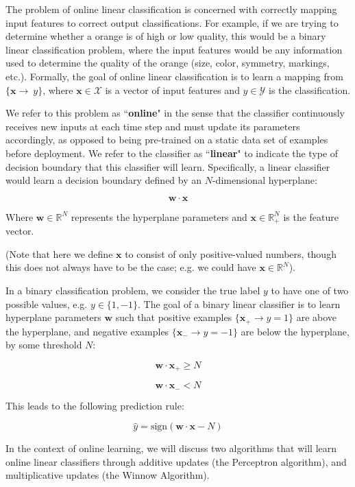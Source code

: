 \documentclass[11pt]{article}
\begin{document}
The problem of online linear classification is concerned with correctly mapping input features to correct output classifications. For example, if we are trying to determine whether a orange is of high or low quality, this would be a binary linear classification problem, where the input features would be any information used to determine the quality of the orange (size, color, symmetry, markings, etc.). Formally, the goal of online linear classification is to learn a mapping from $\{\boldsymbol{x} \rightarrow\ y\}$, where $\boldsymbol{x} \in \mathcal{X}$ is a vector of input features and $y \in \mathcal{Y}$ is the classification.

We refer to this problem as ``\textbf{online}" in the sense that the classifier continuously receives new inputs at each time step and must update its parameters accordingly, as opposed to being pre-trained on a static data set of examples before deployment. We refer to the classifier as ``\textbf{linear}" to indicate the type of decision boundary that this classifier will learn. Specifically, a linear classifier would learn a decision boundary defined by an $N$-dimensional hyperplane:

$$ \boldsymbol{w} \cdot \boldsymbol{x} $$

Where $ \boldsymbol{w} \in \mathbb{R}^N$ represents the hyperplane parameters and $\boldsymbol{x} \in \mathbb{R}_+^N$ is the feature vector.

(Note that here we define $\boldsymbol{x}$ to consist of only positive-valued numbers, though this does not always have to be the case; e.g. we could have $\boldsymbol{x}\in\mathbb{R}^N$).

In a binary classification problem, we consider the true label $y$ to have one of two possible values, e.g. $y\in \{1,-1\}$. The goal of a binary linear classifier is to learn hyperplane parameters $\boldsymbol{w}$ such that positive examples $\{\boldsymbol{x}_+ \rightarrow y=1\}$ are above the hyperplane, and negative examples $\{\boldsymbol{x}_- \rightarrow y = -1\}$ are below the hyperplane, by some threshold $N$:

$$\boldsymbol{w} \cdot \boldsymbol{x}_{+} \geq N $$

$$\boldsymbol{w} \cdot \boldsymbol{x}_{-} < N $$

This leads to the following prediction rule:

$$\hat{y} = \text{sign}(\boldsymbol{w} \cdot \boldsymbol{x} - N) $$


In the context of online learning, we will discuss two algorithms that will learn online linear classifiers through additive updates (the Perceptron algorithm), and multiplicative updates (the Winnow Algorithm).
\end{document}
